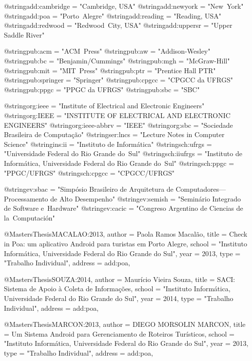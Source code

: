 %
%
@string{add:cambridge = "Cambridge, USA"}
@string{add:newyork = "New~York"}
@string{add:poa = "Porto~Alegre"}
@string{add:reading = "Reading, USA"}
@string{add:redwood = "Redwood~City, USA"}
@string{add:uppersr = "Upper Saddle River"}

%
%
@string{pub:acm = "ACM~Press"}
@string{pub:aw = "Addison-Wesley"}
@string{pub:bc = "Benjamin/Cummings"}
@string{pub:mgh = "McGraw-Hill"}
@string{pub:mit = "MIT~Press"}
@string{pub:ptr = "Prentice Hall PTR"}
@string{pub:springer = "Springer"}
@string{pub:cpgcc = "CPGCC da UFRGS"}
@string{pub:ppgc = "PPGC da UFRGS"}
@string{pub:sbc = "SBC"}

%
%
@string{org:ieee = "Institute of Electrical and Electronic Engineers"}
@string{org:IEEE = "{INSTITUTE OF ELECTRICAL AND ELECTRONIC ENGINEERS}"}
@string{org:ieee-abbrv = "IEEE"}
@string{org:sbc = "Sociedade Brasileira de Computa{\c{c}}{\~a}o"}
@string{ser:lncs = "Lecture Notes in Computer Science"}
@string{ins:ii = "Instituto de Inform{\'a}tica"}
@string{sch:ufrgs = "Universidade Federal do Rio Grande do~Sul"}
@string{sch:iiufrgs = "Instituto de Inform{\'a}tica, Universidade Federal do Rio Grande do~Sul"}
@string{sch:ppgc = "PPGC/UFRGS"}
@string{sch:cpgcc = "CPGCC/UFRGS"}

%
%
@string{ev:sbac = "Simp{\'o}sio Brasileiro de Arquitetura de Computadores---Processamento de Alto Desempenho"}
@string{ev:semish = "Semin{\'a}rio Integrado de Software e~Hardware"}
@string{ev:cacic = "Congreso Argentino de Ciencias de la~Computaci{\'o}n"}

@MastersThesis{MACALAO:2013,
  author =   {Paola Ramos Macal{\~a}o},
  title =    {{Check in Poa: um aplicativo Android para turistas em Porto Alegre}},
  school =   "Instituto Inform{\'a}tica, Universidade Federal do Rio Grande do Sul",
  year =   2013,
  type =   "Trabalho Individual",
  address = add:poa,
}

@MastersThesis{SOUZA:2014,
  author =   {Maur{\'i}cio Vieira Souza},
  title =    {{SACI: Sistema de Apoio {\`a} Coleta de Informa{\c{c}}{\~o}es}},
  school =   "Instituto Inform{\'a}tica, Universidade Federal do Rio Grande do Sul",
  year =   2014,
  type =   "Trabalho Individual",
  address = add:poa,
}

@MastersThesis{MARCON:2013,
  author =   {DIEGO MORSOLIN MARCON},
  title =    {{Um Sistema Android para Gerenciamento de Roteiros Tur{\'i}sticos}},
  school =   "Instituto Inform{\'a}tica, Universidade Federal do Rio Grande do Sul",
  year =   2013,
  type =   "Trabalho Individual",
  address = add:poa,
}
